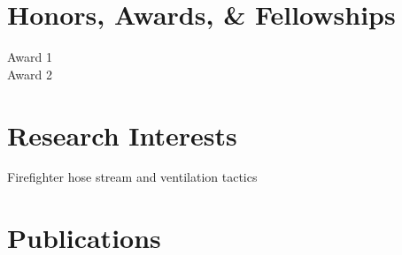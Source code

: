 \documentclass[10pt,letterpaper]{article}
\begin{document}
\section*{Honors, Awards, \& Fellowships}

Award 1 \\
Award 2 \\


\section*{Research Interests}
Firefighter hose stream and ventilation tactics \\


\clearpage

\section*{Publications}

\nocite{*}
\printbibliography[title=Journal Articles, type=article]
\printbibliography[title=Peer Reviewed Technical Reports, type=report]
\printbibliography[title=In Proceedings, type=inproceedings]
\end{document}
